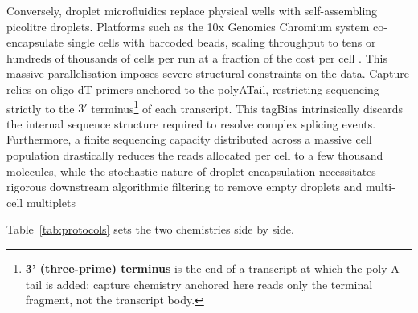 Conversely, droplet microfluidics replace physical wells with self-assembling picolitre droplets. Platforms such as the 10x Genomics Chromium system co-encapsulate single cells with barcoded beads, scaling throughput to tens or hundreds of thousands of cells per run at a fraction of the cost per cell \cite{ding2020systematic}. This massive parallelisation imposes severe structural constraints on the data. Capture relies on oligo-dT primers anchored to the \gls{polyATail}, restricting sequencing strictly to the $3'$ terminus\footnote{\textbf{3' (three-prime) terminus} is the end of a transcript at which the poly-A tail is added; capture chemistry anchored here reads only the terminal fragment, not the transcript body.} of each transcript. This \gls{tagBias} intrinsically discards the internal sequence structure required to resolve complex splicing events. Furthermore, a finite sequencing capacity distributed across a massive cell population drastically reduces the reads allocated per cell to a few thousand molecules, while the stochastic nature of droplet encapsulation necessitates rigorous downstream algorithmic filtering to remove empty droplets and multi-cell multiplets

Table~\ref{tab:protocols} sets the two chemistries side by side.

